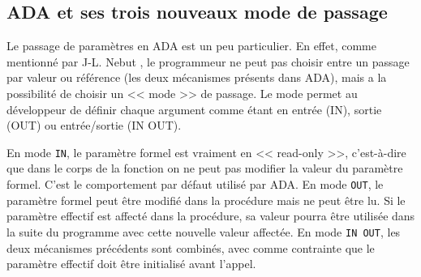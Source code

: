     \subsection{ADA et ses trois nouveaux mode de passage}
   
   Le passage de paramètres en ADA est un peu particulier. En effet, comme mentionné par J-L. Nebut \cite{opac-b1077467}, le programmeur ne peut pas choisir entre un passage par valeur ou référence (les deux mécanismes présents dans ADA), mais a la possibilité de choisir un << mode >> de passage. Le mode permet au développeur de définir chaque argument comme étant en entrée (IN), sortie (OUT) ou entrée/sortie (IN OUT).

En mode \texttt{IN}, le paramètre formel est vraiment en << read-only >>, c'est-à-dire que dans le corps de la fonction on ne peut pas modifier la valeur du paramètre formel. C'est le comportement par défaut utilisé par ADA. En mode \texttt{OUT}, le paramètre formel peut être modifié dans la procédure mais ne peut être lu. Si le paramètre effectif est affecté dans la procédure, sa valeur pourra être utilisée dans la suite du programme avec cette nouvelle valeur affectée. En mode \texttt{IN OUT}, les deux mécanismes précédents sont combinés, avec comme contrainte que le paramètre effectif doit être initialisé avant l'appel.
    
    
